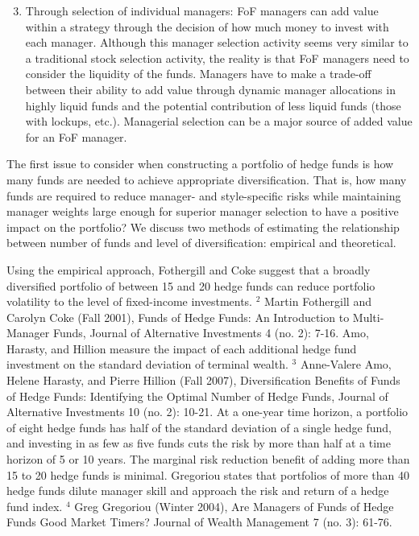 \documentclass[11pt]{article}
\begin{document}
\begin{enumerate}
  \setcounter{enumi}{2}
  \item Through selection of individual managers: FoF managers can add value within a strategy through the decision of how much money to invest with each manager. Although this manager selection activity seems very similar to a traditional stock selection activity, the reality is that FoF managers need to consider the liquidity of the funds. Managers have to make a trade-off between their ability to add value through dynamic manager allocations in highly liquid funds and the potential contribution of less liquid funds (those with lockups, etc.). Managerial selection can be a major source of added value for an FoF manager.
\end{enumerate}

The first issue to consider when constructing a portfolio of hedge funds is how many funds are needed to achieve appropriate diversification. That is, how many funds are required to reduce manager- and style-specific risks while maintaining manager weights large enough for superior manager selection to have a positive impact on the portfolio? We discuss two methods of estimating the relationship between number of funds and level of diversification: empirical and theoretical.

Using the empirical approach, Fothergill and Coke suggest that a broadly diversified portfolio of between 15 and 20 hedge funds can reduce portfolio volatility to the level of fixed-income investments. ${ }^{2}$ Martin Fothergill and Carolyn Coke (Fall 2001), Funds of Hedge Funds: An Introduction to Multi-Manager Funds, Journal of Alternative Investments 4 (no. 2): 7-16. Amo, Harasty, and Hillion measure the impact of each additional hedge fund investment on the standard deviation of terminal wealth. ${ }^{3}$ Anne-Valere Amo, Helene Harasty, and Pierre Hillion (Fall 2007), Diversification Benefits of Funds of Hedge Funds: Identifying the Optimal Number of Hedge Funds, Journal of Alternative Investments 10 (no. 2): 10-21. At a one-year time horizon, a portfolio of eight hedge funds has half of the standard deviation of a single hedge fund, and investing in as few as five funds cuts the risk by more than half at a time horizon of 5 or 10 years. The marginal risk reduction benefit of adding more than 15 to 20 hedge funds is minimal. Gregoriou states that portfolios of more than 40 hedge funds dilute manager skill and approach the risk and return of a hedge fund index. ${ }^{4}$ Greg Gregoriou (Winter 2004), Are Managers of Funds of Hedge Funds Good Market Timers? Journal of Wealth Management 7 (no. 3): 61-76.
\end{document}
